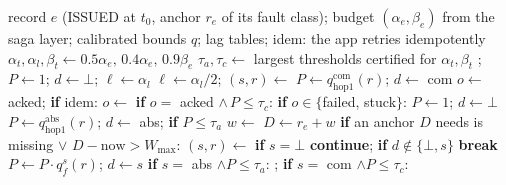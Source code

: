 \begin{algorithm}[t]
\caption{\alg: resolve one ghost effect $e$}
\label{alg:recover}
\small
\begin{algorithmic}[1]
\Require record $e$ (\textsf{ISSUED} at $t_0$, anchor $r_e$ of its fault class); budget $(\alpha_e,\beta_e)$ from the saga layer; calibrated bounds $q$; lag tables; idem: the app retries idempotently
\State $\alpha_t,\alpha_l,\beta_t\gets 0.5\alpha_e,\,0.4\alpha_e,\,0.9\beta_e$ 
\State $\tau_a,\tau_c\gets$ largest thresholds certified for $\alpha_t,\beta_t$ 
\State {}; $P\gets1$; $d\gets\bot$; $\ell\gets\alpha_l$
  \State $\ell\gets\alpha_l/2$; $(s,r)\gets$  \label{alg:hop1}
   $P\gets q^{\mathrm{com}}_{\text{hop1}}(r)$; $d\gets$ com\label{alg:g2}
    \State $o\gets$ acked; \textbf{if} idem: $o\gets$  
    \State \textbf{if} $o=$ acked $\wedge\,P\le\tau_c$: \Return {}
    \State \textbf{if} $o\in\{$failed, stuck$\}$: $P\gets1$; $d\gets\bot$ 
   $P\gets q^{\mathrm{abs}}_{\text{hop1}}(r)$; $d\gets$ abs; \textbf{if} $P\le\tau_a$ \Return {}\label{alg:abs1}
  \EndIf
\EndIf
{}
  \State $w\gets$  \label{alg:cw}
  \State $D\gets r_e+w$ 
  \State \textbf{if} an anchor $D$ needs is missing $\vee$ $D-\text{now}>W_{\max}$: \Return {}\label{alg:wcap}
  \State {}\label{alg:wait}
\EndIf
{}
  \State $(s,r)\gets$  \label{alg:read}
  \State \textbf{if} $s=\bot$ \textbf{continue}; \textbf{if} $d\notin\{\bot,s\}$ \textbf{break}
  \State $P\gets P\cdot q^{s}_f(r)$; $d\gets s$
  \State \textbf{if} $s=$ abs $\wedge P\le\tau_a$: ; \Return {}
  \State \textbf{if} $s=$ com $\wedge P\le\tau_c$: \Return {}\label{alg:com}
\EndFor
\State \Return {} \label{alg:ask}
\end{algorithmic}
\end{algorithm}

